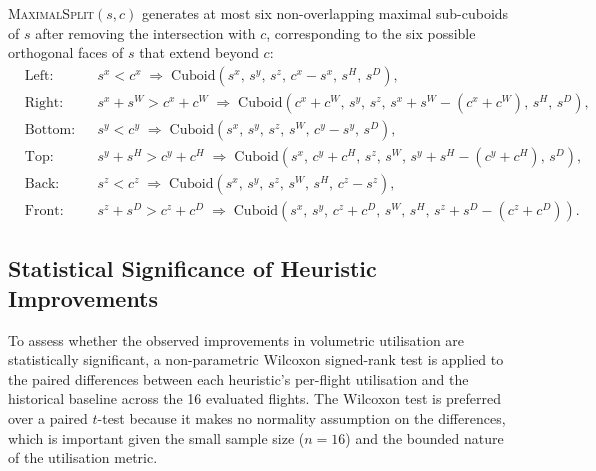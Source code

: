\noindent
\textsc{MaximalSplit}$(s, c)$ generates at most six non-overlapping
maximal sub-cuboids of $s$ after removing the intersection with $c$,
corresponding to the six possible orthogonal faces of $s$ that extend
beyond $c$:
\begin{align}
\label{eq:maxsplit}
&\text{Left:}   && s^x < c^x \;\Rightarrow\; \mathrm{Cuboid}(s^x,\, s^y,\, s^z,\,
                    c^x - s^x,\, s^H,\, s^D),                         \nonumber\\
&\text{Right:}  && s^x + s^W > c^x + c^W \;\Rightarrow\; \mathrm{Cuboid}(c^x+c^W,\, s^y,\, s^z,\,
                    s^x+s^W - (c^x+c^W),\, s^H,\, s^D),               \nonumber\\
&\text{Bottom:} && s^y < c^y \;\Rightarrow\; \mathrm{Cuboid}(s^x,\, s^y,\, s^z,\,
                    s^W,\, c^y - s^y,\, s^D),                          \nonumber\\
&\text{Top:}    && s^y + s^H > c^y + c^H \;\Rightarrow\; \mathrm{Cuboid}(s^x,\, c^y+c^H,\, s^z,\,
                    s^W,\, s^y+s^H-(c^y+c^H),\, s^D),                  \nonumber\\
&\text{Back:}   && s^z < c^z \;\Rightarrow\; \mathrm{Cuboid}(s^x,\, s^y,\, s^z,\,
                    s^W,\, s^H,\, c^z - s^z),                          \nonumber\\
&\text{Front:}  && s^z + s^D > c^z + c^D \;\Rightarrow\; \mathrm{Cuboid}(s^x,\, s^y,\, c^z+c^D,\,
                    s^W,\, s^H,\, s^z+s^D-(c^z+c^D)).                  \nonumber
\end{align}



\subsection{Statistical Significance of Heuristic Improvements}
\label{sec:statistics}

To assess whether the observed improvements in volumetric utilisation are
statistically significant, a non-parametric Wilcoxon signed-rank test
\citep{Wilcoxon1945} is applied to the paired differences between each
heuristic's per-flight utilisation and the historical baseline across
the 16 evaluated flights.
The Wilcoxon test is preferred over a paired $t$-test because it makes
no normality assumption on the differences, which is important given the
small sample size ($n=16$) and the bounded nature of the utilisation
metric.

